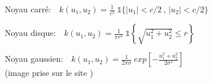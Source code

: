 \documentclass[stage2a]{tnreport}
\begin{document}
\begin{minipage}{0.6\linewidth}
Noyau carré:\begin{math}\quad k(u_1,u_2) = \displaystyle\frac{1}{c^2} \  \mathds{1}\{ |u_1| < c/2 \  , \, |u_2| < c/2  \} \end{math}

\vspace{1.5cm}

Noyau disque:\begin{math}\quad k(u_1,u_2) = \displaystyle\frac{1}{\pi r^2} \  \mathds{1} \left \{ \sqrt{u_1^2 + u_2^2} \leq r \right \} \end{math}

\vspace{1.5cm}

Noyau gaussien:\begin{math}\quad k(u_1,u_2) = \displaystyle\frac{1}{2 \pi \sigma} \  exp \left [ -\displaystyle\frac{u_1^2 + u_2^2}{2 \sigma^2} \right ] \end{math}\\
(image prise sur le site \cite{Gauss})

\end{minipage}\hfill
\end{document}
